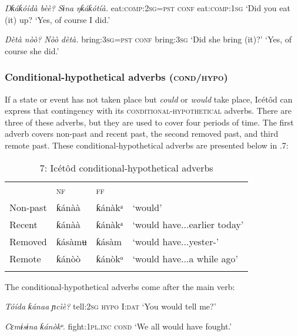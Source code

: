 \begin{table}
\textit{Ŋ}\textit{ƙáƙóídà bèè?    }\textit{Sɨna}\textit{   ŋƙáƙótíà.}
eat:\textsc{comp:2sg=pst}    \textsc{conf   }eat\textsc{:comp:1sg}
‘Did you eat (it) up?  ‘Yes, of course I did.’




\textit{Dètà nòò?      }\textit{Nòò}\textit{   dètà.}
bring:\textsc{3sg=pst}    \textsc{conf}   bring:\textsc{3sg}
‘Did she bring (it)?’    ‘Yes, of course she did.’




\subsubsection{Conditional-hypothetical adverbs (\textsc{cond}/\textsc{hypo})}

If a state or event has not taken place but \textit{could} or \textit{would} take place, Icétôd can express that contingency with its \textsc{conditional-hypothetical} adverbs. There are three of these adverbs, but they are used to cover four periods of time. The first adverb covers non-past and recent past, the second removed past, and third remote past. These conditional-hypothetical adverbs are presented below in .7:


\begin{table}
\caption{7: Icétôd conditional-hypothetical adverbs}
\label{tab:9}


\begin{tabularx}{\textwidth}{XXXX} & \textsc{nf} & \textsc{ff} & \\
\lsptoprule
Non-past & ƙánàà & ƙánàkᵃ & ‘would’\\
Recent & ƙánàà & ƙánàkᵃ & ‘would have...earlier today’\\
Removed & ƙásàmʉ & ƙásàm & ‘would have...yester-’\\
Remote & ƙánòò & ƙánòkᵒ & ‘would have...a while ago’\\
\lspbottomrule
\end{tabularx}
\end{table}
The conditional-hypothetical adverbs come after the main verb:




\textit{Tóída     }\textit{ƙánaa}\textit{   ɲcìè?}
tell:\textsc{2sg}   \textsc{hypo}     I:\textsc{dat}
‘You would tell me?’




\textit{Cɛmɨsɨna   }\textit{ƙánòkᵒ}.
fight:\textsc{1pl.inc cond}
‘We all would have fought.’





\end{table}
